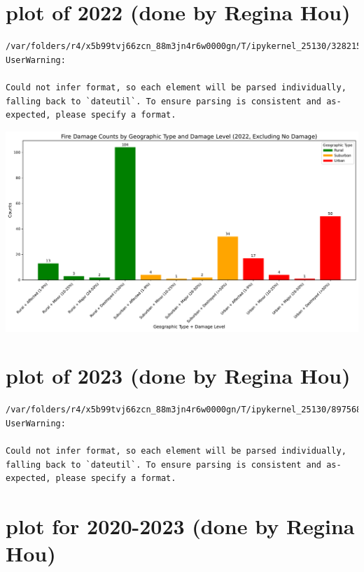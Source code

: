 \documentclass[
  letterpaper,
  DIV=11,
  numbers=noendperiod]{scrartcl}
\begin{document}
\section{plot of 2022 (done by Regina
Hou)}\label{plot-of-2022-done-by-regina-hou}

\begin{verbatim}
/var/folders/r4/x5b99tvj66zcn_88m3jn4r6w0000gn/T/ipykernel_25130/3282159924.py:2: UserWarning:

Could not infer format, so each element will be parsed individually, falling back to `dateutil`. To ensure parsing is consistent and as-expected, please specify a format.
\end{verbatim}

\includegraphics{Final Writeup_files/figure-pdf/cell-16-output-1.pdf}

\section{plot of 2023 (done by Regina
Hou)}\label{plot-of-2023-done-by-regina-hou}

\begin{verbatim}
/var/folders/r4/x5b99tvj66zcn_88m3jn4r6w0000gn/T/ipykernel_25130/897568859.py:2: UserWarning:

Could not infer format, so each element will be parsed individually, falling back to `dateutil`. To ensure parsing is consistent and as-expected, please specify a format.
\end{verbatim}

\section{plot for 2020-2023 (done by Regina
Hou)}\label{plot-for-2020-2023-done-by-regina-hou}
\end{document}
